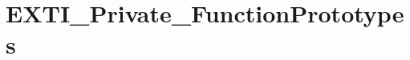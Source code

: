 \hypertarget{group___e_x_t_i___private___function_prototypes}{}\section{E\+X\+T\+I\+\_\+\+Private\+\_\+\+Function\+Prototypes}
\label{group___e_x_t_i___private___function_prototypes}
